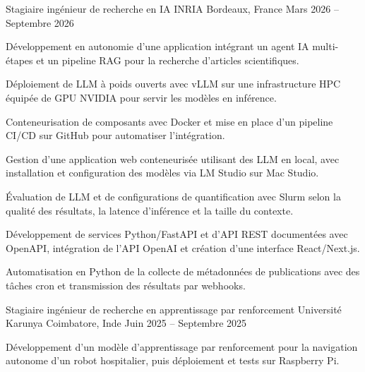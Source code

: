 
\begin{cventries}
  \cventry
    {Stagiaire ingénieur de recherche en IA}
    {INRIA}
    {Bordeaux, France}
    {Mars 2026 -- Septembre 2026}
    {
      \begin{cvitems}
        \item {Développement en autonomie d’une application intégrant un agent IA multi-étapes et un pipeline RAG pour la recherche d’articles scientifiques.}
        \item {Déploiement de LLM à poids ouverts avec vLLM sur une infrastructure HPC équipée de GPU NVIDIA pour servir les modèles en inférence.}
        \item {Conteneurisation de composants avec Docker et mise en place d’un pipeline CI/CD sur GitHub pour automatiser l’intégration.}
        \item {Gestion d’une application web conteneurisée utilisant des LLM en local, avec installation et configuration des modèles via LM Studio sur Mac Studio.}
        \item {Évaluation de LLM et de configurations de quantification avec Slurm selon la qualité des résultats, la latence d’inférence et la taille du contexte.}
        \item {Développement de services Python/FastAPI et d’API REST documentées avec OpenAPI, intégration de l’API OpenAI et création d’une interface React/Next.js.}
        \item {Automatisation en Python de la collecte de métadonnées de publications avec des tâches cron et transmission des résultats par webhooks.}
      \end{cvitems}
    }

  \cventry
    {Stagiaire ingénieur de recherche en apprentissage par renforcement}
    {Université Karunya}
    {Coimbatore, Inde}
    {Juin 2025 -- Septembre 2025}
    {
      \begin{cvitems}
        \item {Développement d’un modèle d’apprentissage par renforcement pour la navigation autonome d’un robot hospitalier, puis déploiement et tests sur Raspberry Pi.}
      \end{cvitems}
    }
\end{cventries}
